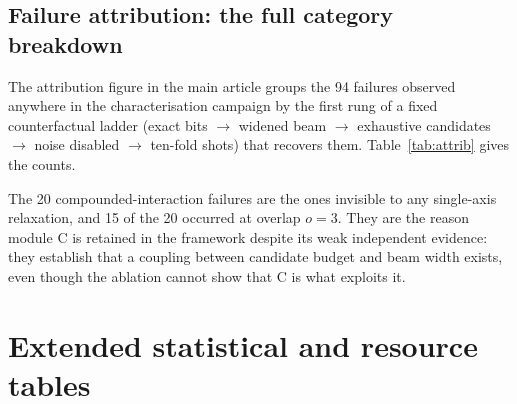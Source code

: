 \documentclass[preprint,11pt]{elsarticle}
\begin{document}
\subsection{Failure attribution: the full category breakdown}

The attribution figure in the main article groups the 94 failures
observed anywhere in the characterisation campaign by the first rung of a
fixed counterfactual ladder (exact bits $\to$ widened beam $\to$
exhaustive candidates $\to$ noise disabled $\to$ ten-fold shots) that
recovers them. Table~\ref{tab:attrib} gives the counts.

\begin{table}[h]
\centering\small
\caption{Root-cause attribution of all 94 naturally observed failures,
from \texttt{phase5\_attribution.csv}. The first two rows are the
classical-budget mechanisms that motivated the method.}
\label{tab:attrib}
\end{table}

The 20 compounded-interaction failures are the ones invisible to any
single-axis relaxation, and 15 of the 20 occurred at overlap $o=3$. They
are the reason module C is retained in the framework despite its weak
independent evidence: they establish that a coupling between candidate
budget and beam width exists, even though the ablation cannot show that C
is what exploits it.


\section{Extended statistical and resource tables}
\label{si:tables}
\end{document}
